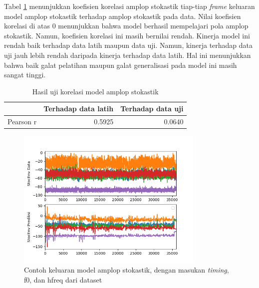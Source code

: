 Tabel \ref{tab-stoc-testing-results} menunjukkan koefisien korelasi amplop stokastik tiap-tiap \textit{frame} keluaran model amplop stokastik terhadap amplop stokastik pada data. Nilai koefisien korelasi di atas 0 menunjukkan bahwa model berhasil mempelajari pola amplop stokastik. Namun, koefisien korelasi ini masih bernilai rendah. Kinerja model ini rendah baik terhadap data latih maupun data uji. Namun, kinerja terhadap data uji jauh lebih rendah daripada kinerja terhadap data latih. Hal ini menunjukkan bahwa baik galat pelatihan maupun galat generalisasi pada model ini masih sangat tinggi.

\begin{table}[htbp]
    \centering
    \caption{Hasil uji korelasi model amplop stokastik}\label{tab-stoc-testing-results}
    \begin{tabular}{ |l|r|r| } 
     \cline{2-3}
     \multicolumn{1}{l|}{}&Terhadap data latih&Terhadap data uji\\\hline
	 Pearson r&0.5925  &0.0640\\\hline
    \end{tabular}
\end{table}

\begin{figure}[htbp]
    \centering
    \includegraphics[width=0.8\textwidth]{resources/Analisis_StocEnv.png}
    \caption{Contoh keluaran model amplop stokastik, dengan masukan \textit{timing}, f0, dan hfreq dari dataset}\label{fig-stocenv-output-sample}
\end{figure}

